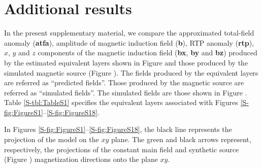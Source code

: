 \section{Additional results}
\label{eq:additional_results}

In the present supplementary material, we compare the approximated total-field anomaly (\textbf{atfa}), 
amplitude of magnetic induction field (\textbf{b}), RTP anomaly (\textbf{rtp}), $x$, $y$ and $z$ 
components of the magnetic induction field (\textbf{bx}, \textbf{by} and \textbf{bz}) 
produced by the estimated equivalent layers shown in Figure  and those produced by the 
simulated magnetic source (Figure ). The fields produced by the equivalent layers are 
referred as ``predicted fields''. Those produced by the magnetic source are referred as 
``simulated fields''. The simulated fields are those shown in Figure . 
Table \ref{S-tbl:TableS1} specifies the equivalent layers associated with Figures 
\ref{S-fig:FigureS1}--\ref{S-fig:FigureS18}.

In Figures \ref{S-fig:FigureS1}--\ref{S-fig:FigureS18}, the black line represents the projection of the model on the 
$xy$ plane. The green and black arrows represent, respectively, the projections of the constant main field and 
synthetic source (Figure ) magnetization directions onto the plane $xy$.